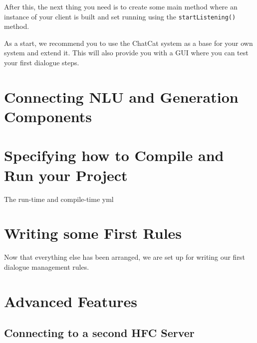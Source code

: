 \documentclass[a4paper]{report}
\begin{document}
After this, the next thing you need is to create some main method where an instance of your client is built and set running using the \texttt{startListening()} method.

As a start, we recommend you to use the ChatCat system as a base for your own system and extend it. This will also provide you with a GUI where you can test your first dialogue steps.

\section{Connecting NLU and Generation Components}


\section{Specifying how to Compile and Run your Project}

The run-time and compile-time yml

\section{Writing some First Rules}

Now that everything else has been arranged, we are set up for writing our first dialogue management rules. 

\section{Advanced Features}

\subsection{Connecting to a second HFC Server}
\end{document}
